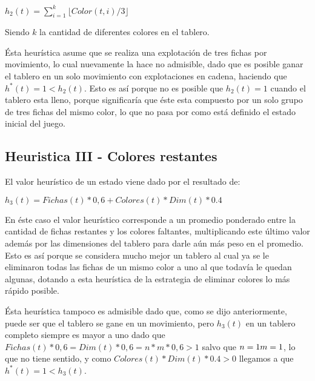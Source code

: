 \documentclass[%
    final,
    reprint,
    notitlepage,
    narroweqnarray,
    inline,
    twoside,
    invited
    ]{ieee}
\begin{document}
\begin{center}
\begin{math}
h_2(t) = \sum\limits_{i=1}^k \lfloor Color(t, i) / 3 \rfloor
\end{math}\\
\end{center}

Siendo $k$ la cantidad de diferentes colores en el tablero.\\
\par \'Esta heur\'istica asume que se realiza una explotaci\'on de tres fichas por movimiento, lo cual nuevamente la hace no admisible, dado que es posible ganar el tablero en un solo movimiento con explotaciones en cadena, haciendo que $h^*(t)=1 < h_2(t)$. Esto es as\'i porque no es posible que $h_2(t) = 1$ cuando el tablero esta lleno, porque significar\'ia que \'este esta compuesto por un solo grupo de tres fichas del mismo color, lo que no pasa por como est\'a definido el estado inicial del juego.\\

\subsection{Heuristica III - Colores restantes}
El valor heur\'istico de un estado viene dado por el resultado de:\\

\begin{center}
\begin{math}
h_3(t) = Fichas(t)*0,6 + Colores(t)*Dim(t)*0.4
\end{math}\\
\end{center}

\par En \'este caso el valor heur\'istico corresponde a un promedio ponderado entre la cantidad de fichas restantes y los colores faltantes, multiplicando este \'ultimo valor adem\'as por las dimensiones del tablero para darle a\'un m\'as peso en el promedio. Esto es as\'i porque se considera mucho mejor un tablero al cual ya se le eliminaron todas las fichas de un mismo color a uno al que todav\'ia le quedan algunas, dotando a esta heur\'istica de la estrategia de eliminar colores lo m\'as r\'apido posible.\\
\par \'Esta heur\'istica tampoco es admisible dado que, como se dijo anteriormente, puede ser que el tablero se gane en un movimiento, pero $h_3(t)$ en un tablero completo siempre es mayor a uno dado que $Fichas(t)*0,6 = Dim(t)*0,6 = n*m*0,6 > 1$ salvo que $n=1 \relax m=1$, lo que no tiene sentido, y como $Colores(t)*Dim(t)*0.4 >0$ llegamos a que $h^*(t)=1 < h_3(t)$.
\end{document}
